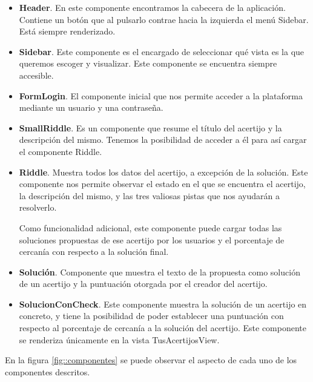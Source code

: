 \begin{itemize}
    \item \textbf{Header}. En este componente encontramos la cabecera de la aplicación. Contiene un botón que al pulsarlo contrae hacia la izquierda el menú Sidebar. Está siempre renderizado.
    \item \textbf{Sidebar}. Este componente es el encargado de seleccionar qué vista es la que queremos escoger y visualizar. Este componente se encuentra siempre accesible.
    \item \textbf{FormLogin}. El componente inicial que nos permite acceder a la plataforma mediante un usuario y una contraseña.
    \item \textbf{SmallRiddle}. Es un componente que resume el título del acertijo y la descripción del mismo. Tenemos la posibilidad de acceder a él para así cargar el componente Riddle.
    \item \textbf{Riddle}. Muestra todos los datos del acertijo, a excepción de la solución. Este componente nos permite observar el estado en el que se encuentra el acertijo, la descripción del mismo, y las tres valiosas pistas que nos ayudarán a resolverlo.
    
    Como funcionalidad adicional, este componente puede cargar todas las soluciones propuestas de ese acertijo  por los usuarios y el porcentaje de cercanía con respecto a la solución final.
    \item \textbf{Solución}. Componente que muestra el texto de la propuesta como solución de un acertijo y la puntuación otorgada por el creador del acertijo.
    \item \textbf{SolucionConCheck}. Este componente muestra la solución de un acertijo en concreto, y tiene la posibilidad de poder establecer una puntuación con respecto al porcentaje de cercanía a la solución del acertijo. Este componente se renderiza únicamente en la vista TusAcertijosView.
\end{itemize}

En la figura \ref{fig::componentes} se puede observar el aspecto de cada uno de los componentes descritos.

